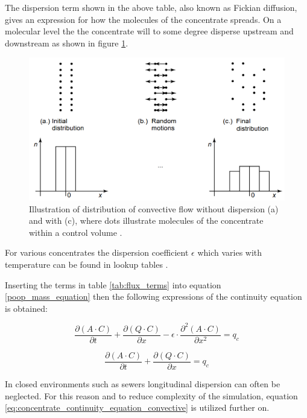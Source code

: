 The dispersion term shown in the above table, also known as Fickian diffusion, gives an expression for how the molecules of the concentrate spreads. On a molecular level the the concentrate will to some degree disperse upstream and downstream as shown in figure \ref{fig:diffusion_example}. 

\begin{figure}[H]
\centering
\includegraphics[width=.75\textwidth]{report/modeling/pictures/diffusion_example.png}
\caption{Illustration of distribution of convective flow without dispersion (a) and with (c), where dots illustrate molecules of the concentrate within a control volume \cite{karlruhe_con_def_dif_equation}.}
\label{fig:diffusion_example}
\end{figure} 

For various concentrates the dispersion coefficient $\epsilon$ which varies with temperature can be found in lookup tables \cite{karlruhe_con_def_dif_equation}.

Inserting the terms in table \ref{tab:flux_terms} into equation \ref{poop_mass_equation} then the following expressions of the continuity equation is obtained:

\begin{equation}
	\frac{\partial (A\cdot C)}{\partial t} + \frac{\partial (Q \cdot C)}{\partial x} - \epsilon \cdot \frac{\partial^2 (A \cdot C)}{\partial x^2} = q_c 
\label{eq:concentrate_continuity_equation_dispersion}
\end{equation}

\begin{equation}
\boxed{	\frac{\partial (A\cdot C)}{\partial t} + \frac{\partial (Q \cdot C)}{\partial x} = q_c} 
\label{eq:concentrate_continuity_equation_convective}
\end{equation}

In closed environments such as sewers longitudinal dispersion can often be neglected\cite{vestergaard1989numerical}. For this reason and to reduce complexity of the simulation, equation \ref{eq:concentrate_continuity_equation_convective} is utilized further on. 
